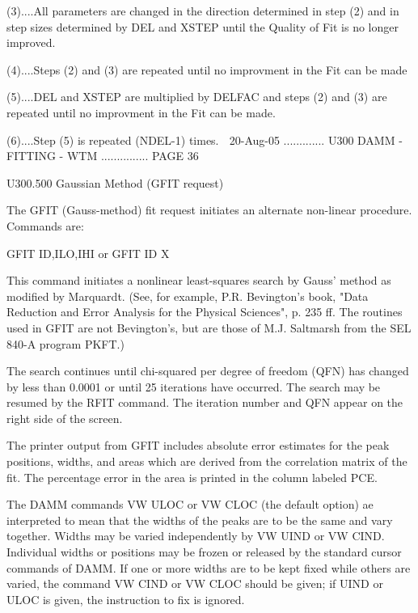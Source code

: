    (3)....All parameters are changed in the direction determined in  step  (2)
          and  in  step sizes determined by DEL and XSTEP until the Quality of
          Fit is no longer improved.
 
   (4)....Steps (2) and (3) are repeated until no improvment in  the  Fit  can
          be made
 
   (5)....DEL  and  XSTEP  are  multiplied by DELFAC and steps (2) and (3) are
          repeated until no improvment in the Fit can be made.
 
   (6)....Step (5) is repeated (NDEL-1) times.
    
   20-Aug-05 ............. U300  DAMM - FITTING - WTM ............... PAGE  36
 
   U300.500  Gaussian Method (GFIT request)
 
   The GFIT (Gauss-method)  fit  request  initiates  an  alternate  non-linear
   procedure. Commands are:
 
   GFIT ID,ILO,IHI
   or
   GFIT ID X
 
   This  command  initiates  a nonlinear least-squares search by Gauss' method
   as modified by Marquardt.  (See, for example, P.R. Bevington's  book, "Data
   Reduction  and  Error  Analysis for the Physical Sciences", p. 235 ff.  The
   routines used in GFIT are not Bevington's, but are those of M.J.  Saltmarsh
   from the SEL 840-A program PKFT.)
 
   The  search  continues  until  chi-squared  per degree of freedom (QFN) has
   changed by less than 0.0001 or until  25  iterations  have  occurred.   The
   search  may  be  resumed by the RFIT command.  The iteration number and QFN
   appear on the right side of the screen.
 
   The printer output from GFIT includes  absolute  error  estimates  for  the
   peak  positions,  widths,  and areas which are derived from the correlation
   matrix of the fit.  The percentage error in  the  area  is  printed  in the
   column labeled PCE.
 
   The  DAMM  commands  VW ULOC or VW CLOC (the default option) ae interpreted
   to mean that the widths of the peaks are to be the same and vary  together.
   Widths  may  be  varied  independently  by  VW UIND or VW CIND.  Individual
   widths or positions may be  frozen  or  released  by  the  standard  cursor
   commands  of DAMM.  If one or more widths are to be kept fixed while others
   are varied, the command VW CIND or VW CLOC should be given; if UIND or ULOC
   is given, the instruction to fix is ignored.
 

